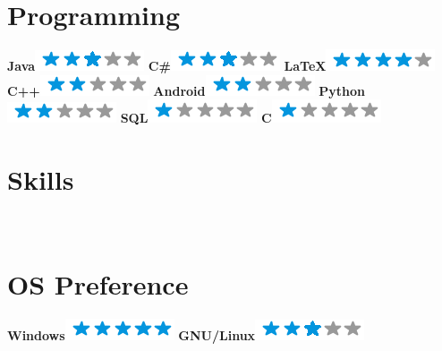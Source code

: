 \documentclass[a4paper]{friggeri-cv}
\begin{document}
\begin{aside}
  \section{Programming}
    \textbf{Java}\includegraphics[scale=0.40]{img/3stars.png}
    \textbf{C\#}\includegraphics[scale=0.40]{img/3stars.png}
    \textbf{\LaTeX}\includegraphics[scale=0.40]{img/4stars.png}
    \textbf{C++}\includegraphics[scale=0.40]{img/2stars.png}
    \textbf{Android}\includegraphics[scale=0.40]{img/2stars.png}
     \textbf{Python}\includegraphics[scale=0.40]{img/2stars.png}
     \textbf{SQL}\includegraphics[scale=0.40]{img/1stars.png}
     \textbf{C}\includegraphics[scale=0.40]{img/1stars.png}
    ~
  \section{Skills}
 ~
  \section{OS Preference}
    \textbf{Windows}\includegraphics[scale=0.40]{img/5stars.png}
    \textbf{GNU/Linux}\includegraphics[scale=0.40]{img/3stars.png}
    ~

\end{aside}
\end{document}
